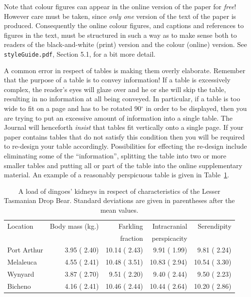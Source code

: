 \documentclass[times, doublespace]{anzsauth}
\begin{document}
Note that colour figures can appear in the online version of the
paper for \emph{free}!  However care must be taken, since \emph{only
one} version of the text of the paper is produced.  Consequently
the online colour figures, and captions and references to figures
in the text, must be structured in such a way as to make sense
both to readers of the black-and-white (print) version and the
colour (online) version.  See \texttt{styleGuide.pdf}, Section
5.1, for a bit more detail.

A common error in respect of tables is making them overly elaborate.
Remember that the purpose of a table is to convey information! If
a table is excessively complex, the reader's eyes will glaze over
and he or she will skip the table, resulting in no information at
all being conveyed.  In particular, if a table is too wide to fit
on a page and has to be rotated 90$^\circ$ in order to be displayed,
then you are trying to put an excessive amount of information into
a single table.  The Journal will henceforth \emph{insist} that
tables fit vertically onto a single page.  If your paper contains
tables that do not satisfy this condition then you will be required
to re-design your table accordingly.  Possibilities for effecting the
re-design include eliminating some of the ``information'', splitting
the table into two or more smaller tables and putting all or part
of the table into the online supplementary material.  An example
of a reasonably perspicuous table is given in Table~\ref{tab:ltdb}.
\begin{table}[htp]
\caption{\label{tab:ltdb}
A load of dingoes' kidneys in respect
of characteristics of the Lesser Tasmanian Drop Bear.  Standard
deviations are given in parentheses after the mean values.}
\centering
\begin{tabular}{|l|r|r|r|r|} \hline
Location & Body mass (kg.) & Farkling & Intracranial & Serendipity \\ 
         &                 & fraction & perspicacity &             \\ \hline
  Port Arthur &  3.95 ( 2.40) & 10.14 ( 2.43) &  9.91 ( 1.99) &  9.81 ( 2.24) \\ 
  Melaleuca   &  4.55 ( 2.41) & 10.48 ( 3.51) & 10.83 ( 2.94) & 10.54 ( 3.30) \\ 
  Wynyard     &  3.87 ( 2.70) &  9.51 ( 2.20) &  9.40 ( 2.44) &  9.50 ( 2.23) \\ 
  Bicheno     &  4.16 ( 2.41) & 10.46 ( 2.44) & 10.44 ( 2.64) & 10.20 ( 2.86) \\ 
   \hline
\end{tabular}
\end{table}
\end{document}
